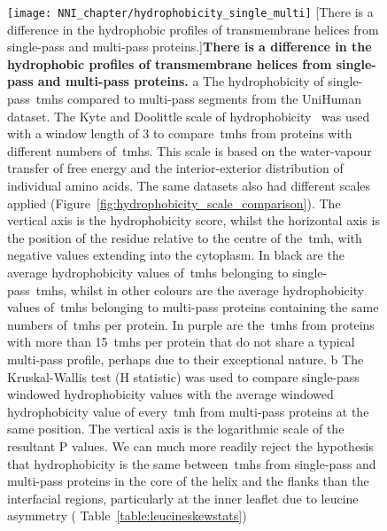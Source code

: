 \begin{figure}[!ht]
\centering
\texttt{[image: NNI\_chapter/hydrophobicity\_single\_multi]}
[There is a difference in the hydrophobic profiles of transmembrane helices from single-pass and multi-pass proteins.]{\textbf{There is a difference in the hydrophobic profiles of transmembrane helices from single-pass and multi-pass proteins.}
 a The hydrophobicity of single-pass~\gls{tmh}s compared to multi-pass segments from the UniHuman dataset.
The Kyte and Doolittle scale of hydrophobicity~\cite{Kyte1982} was used with a window length of 3 to compare~\gls{tmh}s from proteins with different numbers of~\gls{tmh}s.
This scale is based on the water-vapour transfer of free energy and the interior-exterior distribution of individual amino acids.
The same datasets also had different scales applied (Figure~\ref{fig:hydrophobicity_scale_comparison}).
The vertical axis is the hydrophobicity score, whilst the horizontal axis is the position of the residue relative to the centre of the~\gls{tmh}, with negative values extending into the cytoplasm.
In black are the average hydrophobicity values of~\gls{tmh}s belonging to single-pass~\gls{tmh}s, whilst in other colours are the average hydrophobicity values of~\gls{tmh}s belonging to multi-pass proteins containing the same numbers of~\gls{tmh}s per protein.
In purple are the~\gls{tmh}s from proteins with more than 15~\gls{tmh}s per protein that do not share a typical multi-pass profile, perhaps due to their exceptional nature.
b The Kruskal-Wallis test (H statistic) was used to compare single-pass windowed hydrophobicity values with the average windowed hydrophobicity value of every~\gls{tmh} from multi-pass proteins at the same position.
The vertical axis is the logarithmic scale of the resultant P values.
We can much more readily reject the hypothesis that hydrophobicity is the same between~\gls{tmh}s from single-pass and multi-pass proteins in the core of the helix and the flanks than the interfacial regions, particularly at the inner leaflet due to leucine asymmetry ( Table~\ref{table:leucineskewstats})}

\label{fig:hydrophobicity_single_multi}
\end{figure}

